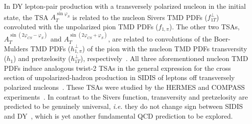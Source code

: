 \documentclass[a4paper,manyauthors,nocleardouble,COMPASS]{cernphprep}
\newcommand{\phiCS}{\varphi _{CS}}
\newcommand{\phiS}{\varphi _S}
\newcommand{\green}{\textcolor[rgb]{0.00,0.59,0.00}}
\begin{document}
In DY lepton-pair production with a transversely polarized nucleon in the initial state, the TSA $A_T^{\sin\phiS}$ is related to the nucleon Sivers TMD PDFs ($f_{1T}^\perp$) convoluted with the unpolarized pion TMD PDFs ($f_{1,\pi}$). The other two TSAs, $A_T^{\sin(2\phiCS-\phiS)}$ and $A_T^{\sin(2\phiCS+\phiS)}$, are related to convolutions of the Boer-Mulders TMD PDFs ($h_{1,\pi}^{\perp}$) of the pion with the nucleon TMD PDFs transversity ($h_1$) and pretzelosity ($h_{1T}^\perp$), respectively~\cite{Bacchetta:2006tn,Arnold:2008kf}.
%
All three aforementioned nucleon TMD PDFs induce analogous twist-2 TSAs in the general expression for the cross section of unpolarized-hadron production in SIDIS of leptons off transversely polarized nucleons~\cite{Kotzinian:1994dv,Bacchetta:2006tn,Arnold:2008kf}. These TSAs were studied by the HERMES and COMPASS experiments~\cite{Alekseev:2008aa,Airapetian:2009ae,Adolph:2012sp,Adolph:2014fjw,Adolph:2014zba,Adolph:2016dvl,Adolph:2012sn,Adolph:2012nw,Parsamyan:2013ug,Pappalardo:2010zz,Bradamante:2017yia}.
%
In contrast to the  Sivers function, transversity and pretzelosity are predicted to be genuinely universal, \textit{i.e.} they do not change sign between SIDIS and DY~\cite{Collins:2011zzd}, which is yet another fundamental QCD prediction to be explored.

\end{document}
